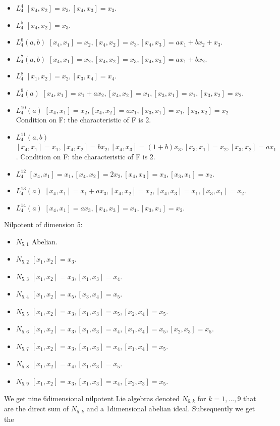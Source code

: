 \documentclass[a4paper,11pt]{report}
\begin{document}
{{\begin{itemize}
\item  $L_4^4$ $[x_4,x_2]=x_3, [x_4,x_3]= x_3$.
\item  $L_4^5$ $[x_4,x_2]=x_3$.
\item  $L_4^6(a,b)$ $[x_4,x_1] = x_2, [x_4,x_2]=x_3, [x_4,x_3] = ax_1+bx_2+x_3$.
\item  $L_4^7(a,b)$ $[x_4,x_1] = x_2, [x_4,x_2]=x_3, [x_4,x_3] = ax_1+bx_2.$ 
\item  $L_4^8$ $[x_1,x_2]=x_2, [x_3,x_4]=x_4$.
\item  $L_4^9(a)$ $[x_4,x_1] = x_1+ax_2, [x_4,x_2]=x_1, [x_3,x_1]=x_1, [x_3,x_2]=x_2$.
\item  $L_4^{10}(a)$ $[x_4,x_1] = x_2, [x_4,x_2]=ax_1, [x_3,x_1]=x_1, [x_3,x_2]=x_2$ Condition on F: the characteristic of F is 2.
\item  $L_4^{11}(a,b)$ $[x_4,x_1] = x_1, [x_4,x_2] = bx_2, [x_4,x_3]=(1+b)x_3, [x_3,x_1]=x_2,
[x_3,x_2]=ax_1$. Condition on F: the characteristic of F is 2. 
\item  $L_4^{12}$ $ [x_4,x_1] = x_1, [x_4,x_2]=2x_2, [x_4,x_3] = x_3, [x_3,x_1]=x_2$.
\item  $L_4^{13}(a)$ $[x_4,x_1] = x_1+ax_3, [x_4,x_2]=x_2, [x_4,x_3] = x_1, [x_3,x_1]=x_2$.
\item  $L_4^{14}(a)$ $[x_4,x_1] = ax_3, [x_4,x_3]=x_1, [x_3,x_1]=x_2$.
\end{itemize}
 Nilpotent of dimension 5: 
\begin{itemize}
\item  $N_{5,1}$ Abelian. 
\item  $N_{5,2}$ $[x_1,x_2]=x_3$.
\item  $N_{5,3}$ $[x_1,x_2]=x_3, [x_1,x_3]=x_4$.
\item  $N_{5,4}$ $[x_1,x_2]=x_5, [x_3,x_4]=x_5$.
\item  $N_{5,5}$ $[x_1,x_2]=x_3, [x_1,x_3]=x_5, [x_2,x_4]=x_5$.
\item  $N_{5,6}$ $[x_1,x_2]=x_3, [x_1,x_3]=x_4, [x_1,x_4]=x_5, [x_2,x_3]=x_5$.
\item  $N_{5,7}$ $[x_1,x_2]=x_3, [x_1,x_3]=x_4, [x_1,x_4]=x_5$.
\item  $N_{5,8}$ $[x_1,x_2]=x_4, [x_1,x_3]=x_5$.
\item  $N_{5,9}$ $[x_1,x_2]=x_3, [x_1,x_3]=x_4, [x_2,x_3]=x_5$.
\end{itemize}
 We get nine 6\texttt{}dimensional nilpotent Lie algebras denoted $N_{6,k}$ for $k=1,...,9$ that are the direct sum of $N_{5,k}$ and a 1\texttt{}dimensional abelian ideal. Subsequently we get the
}}
\end{document}
